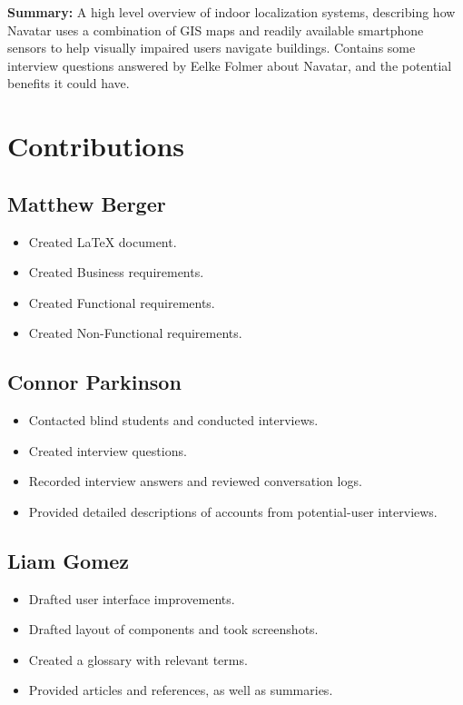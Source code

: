 \documentclass{scrreprt}
\begin{document}
\textbf{Summary:}
A high level overview of indoor localization systems, describing how Navatar uses a combination of GIS maps and readily available smartphone sensors to help visually impaired users navigate buildings. Contains some interview questions answered by Eelke Folmer about Navatar, and the potential benefits it could have.


\chapter{Contributions}
	\section{Matthew Berger}
		\begin{itemize}
			\item Created LaTeX document.
			\item Created Business requirements.
			\item Created Functional requirements.
			\item Created Non-Functional requirements.
		\end{itemize}
	\section{Connor Parkinson}
		\begin{itemize}
			\item Contacted blind students and conducted interviews.
			\item Created interview questions.
			\item Recorded interview answers and reviewed conversation logs.
			\item Provided detailed descriptions of accounts from potential-user interviews.
		\end{itemize}
	\section{Liam Gomez}
		\begin{itemize}
			\item Drafted user interface improvements.
			\item Drafted layout of components and took screenshots.
			\item Created a glossary with relevant terms.
			\item Provided articles and references, as well as summaries.
		\end{itemize}
\end{document}
